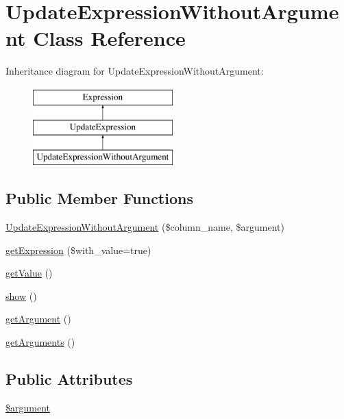 \hypertarget{classUpdateExpressionWithoutArgument}{}\section{Update\+Expression\+Without\+Argument Class Reference}
\label{classUpdateExpressionWithoutArgument}
Inheritance diagram for Update\+Expression\+Without\+Argument\+:\begin{figure}[H]
\begin{center}
\leavevmode
\includegraphics[height=3.000000cm]{classUpdateExpressionWithoutArgument}
\end{center}
\end{figure}
\subsection*{Public Member Functions}
\begin{DoxyCompactItemize}
\item 
\hyperlink{classUpdateExpressionWithoutArgument_a4b92f0becd362f84e0649f2250b8dcd6}{Update\+Expression\+Without\+Argument} (\$column\+\_\+name, \$argument)
\item 
\hyperlink{classUpdateExpressionWithoutArgument_a26520d45130223bf455d335c6187a769}{get\+Expression} (\$with\+\_\+value=true)
\item 
\hyperlink{classUpdateExpressionWithoutArgument_a901f3b067ddafc55479d2728cb1b5ef2}{get\+Value} ()
\item 
\hyperlink{classUpdateExpressionWithoutArgument_a01a16802a0645ae717c010ede1b92f7e}{show} ()
\item 
\hyperlink{classUpdateExpressionWithoutArgument_a6b1b1611de45acf42d4a10f71343de38}{get\+Argument} ()
\item 
\hyperlink{classUpdateExpressionWithoutArgument_ae196b9aa4c42acda72b3ec725b1b7bed}{get\+Arguments} ()
\end{DoxyCompactItemize}
\subsection*{Public Attributes}
\begin{DoxyCompactItemize}
\item 
\hyperlink{classUpdateExpressionWithoutArgument_a1cecdad1efab4b00f0211e7973c1225c}{\$argument}
\end{DoxyCompactItemize}


